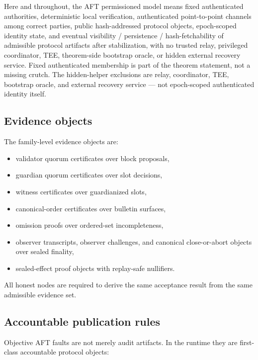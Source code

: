 \documentclass[11pt]{article}
\begin{document}
Here and throughout, the AFT permissioned model means fixed authenticated
authorities, deterministic local verification, authenticated point-to-point
channels among correct parties, public hash-addressed protocol objects,
epoch-scoped identity state, and eventual visibility / persistence /
hash-fetchability of admissible protocol artifacts after stabilization, with no
trusted relay, privileged coordinator, TEE, theorem-side bootstrap oracle, or
hidden external recovery service. Fixed authenticated membership is part of the
theorem statement, not a missing crutch. The hidden-helper exclusions are
relay, coordinator, TEE, bootstrap oracle, and external recovery service ---
not epoch-scoped authenticated identity itself.

\subsection{Evidence objects}

The family-level evidence objects are:

\begin{itemize}[leftmargin=1.5em]
\item validator quorum certificates over block proposals,
\item guardian quorum certificates over slot decisions,
\item witness certificates over guardianized slots,
\item canonical-order certificates over bulletin surfaces,
\item omission proofs over ordered-set incompleteness,
\item observer transcripts, observer challenges, and canonical close-or-abort
objects over sealed finality,
\item sealed-effect proof objects with replay-safe nullifiers.
\end{itemize}

All honest nodes are required to derive the same acceptance result from the
same admissible evidence set.

\subsection{Accountable publication rules}

Objective AFT faults are not merely audit artifacts. In the runtime they
are first-class accountable protocol objects:
\end{document}
